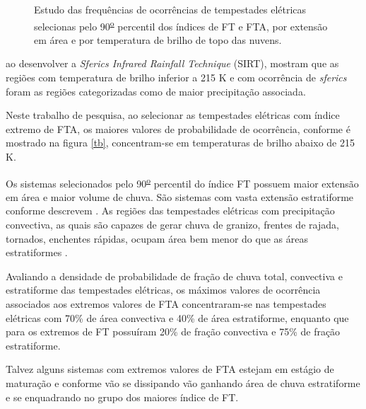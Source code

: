 \begin{figure}[!ht]
  \label{t_tb}
  \caption{Estudo das frequências de ocorrências de tempestades elétricas selecionas pelo 90\textsuperscript{\underline{o}} percentil dos índices de FT e FTA, por extensão em área e por temperatura de brilho de topo das nuvens.}
\end{figure}

 ao desenvolver a \textit{Sferics Infrared Rainfall Technique} (SIRT), mostram que as regiões com temperatura de brilho inferior a 215 K e com ocorrência de \textit{sferics} foram as regiões categorizadas como de maior precipitação associada.

Neste trabalho de pesquisa, ao selecionar as tempestades elétricas com índice extremo de FTA, os maiores valores de probabilidade de ocorrência, conforme é mostrado na figura \ref{tb}, concentram-se em temperaturas de brilho abaixo de 215 K.

Os sistemas selecionados pelo 90\textsuperscript{\underline{o}} percentil do índice FT possuem maior extensão em área e maior volume de chuva. São sistemas com vasta extensão estratiforme conforme descrevem . As regiões das tempestades elétricas com precipitação convectiva, as quais são capazes de gerar chuva de granizo, frentes de rajada, tornados, enchentes rápidas, ocupam área bem menor do que as áreas estratiformes \cite{Jr2007}.

Avaliando a densidade de probabilidade de fração de chuva total, convectiva e estratiforme das tempestades elétricas, os máximos valores de ocorrência associados aos extremos valores de FTA concentraram-se nas tempestades elétricas com 70\% de área convectiva e 40\% de área estratiforme, enquanto que para os extremos de FT possuíram 20\% de fração convectiva e 75\% de fração estratiforme.

Talvez alguns sistemas com extremos valores de FTA estejam em estágio de maturação e conforme vão se dissipando vão ganhando área de chuva estratiforme e se enquadrando no grupo dos maiores índice de FT. 


